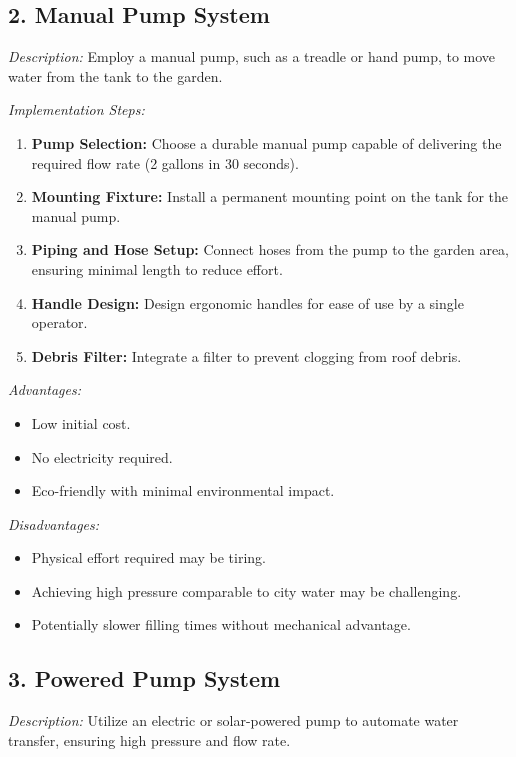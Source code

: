 \documentclass[12pt]{article}
\begin{document}
\subsection*{2. Manual Pump System}

\noindent\textit{Description:} Employ a manual pump, such as a treadle or hand pump, to move water from the tank to the garden.

\noindent\textit{Implementation Steps:}
\begin{enumerate}[noitemsep, topsep=0pt]
\item \textbf{Pump Selection:} Choose a durable manual pump capable of delivering the required flow rate (2 gallons in 30 seconds).
\item \textbf{Mounting Fixture:} Install a permanent mounting point on the tank for the manual pump.
\item \textbf{Piping and Hose Setup:} Connect hoses from the pump to the garden area, ensuring minimal length to reduce effort.
\item \textbf{Handle Design:} Design ergonomic handles for ease of use by a single operator.
\item \textbf{Debris Filter:} Integrate a filter to prevent clogging from roof debris.
\end{enumerate}

\noindent\textit{Advantages:}
\begin{itemize}[noitemsep, topsep=0pt]
\item Low initial cost.
\item No electricity required.
\item Eco-friendly with minimal environmental impact.
\end{itemize}

\noindent\textit{Disadvantages:}
\begin{itemize}[noitemsep, topsep=0pt]
\item Physical effort required may be tiring.
\item Achieving high pressure comparable to city water may be challenging.
\item Potentially slower filling times without mechanical advantage.
\end{itemize}
\newpage
\subsection*{3. Powered Pump System}

\noindent\textit{Description:} Utilize an electric or solar-powered pump to automate water transfer, ensuring high pressure and flow rate.
\end{document}
